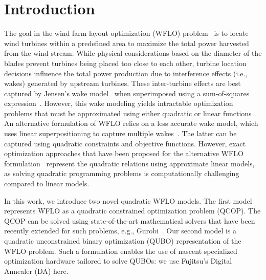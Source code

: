 \documentclass[preprint,12pt]{elsarticle}
\begin{document}
\maketitle 

\section{Introduction}
The goal in the wind farm layout optimization (WFLO)
problem~\cite{MOSETTI1994105} is to locate wind turbines within a
predefined area to maximize the total power harvested from the wind
stream.  While physical considerations based on the diameter of the
blades prevent turbines being placed too close to each other, turbine
location decisions influence the total power production due to
interference effects (i.e., wakes) generated by upstream turbines.
These inter-turbine effects are best captured by Jensen's wake model~\cite{jensen1983note} when superimposed
using a sum-of-squares expression~\cite{Zhang2014}. However,
this wake modeling yields intractable optimization problems
that must be approximated using either quadratic or linear functions~\cite{turner2014new}.
An alternative formulation of WFLO relies on a less accurate wake model, which uses linear superpositioning
to capture multiple wakes~\cite{donovan2005wind}.
The latter can be captured using quadratic
constraints and objective functions. However, exact optimization
approaches that have been proposed for the alternative WFLO formulation~\cite{Zhang2014,kuo2016wind,donovan2005wind,fagerfjall2010optimizing,archer2011wind,sorkhabi2018constrained}
represent the quadratic relations using approximate linear models,
as solving quadratic programming problems
is computationally challenging compared to linear models.

In this work, we introduce two novel quadratic WFLO models. The first
model represents WFLO as a quadratic constrained optimization
problem (QCOP).  The QCOP can be solved using state-of-the-art mathematical solvers
that have been recently extended for such problems, e.g., Gurobi~\cite{gurobi}.  Our
second model is a quadratic unconstrained binary optimization
(QUBO) representation of the WFLO problem.  Such a formulation enables the use of
nascent specialized optimization hardware tailored to solve QUBOs: we use Fujitsu's Digital Annealer (DA) \cite{aramon2019physics} here.
\end{document}
